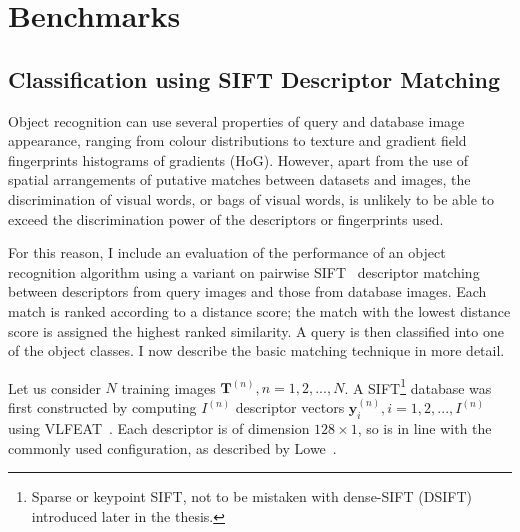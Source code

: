 \section{Benchmarks} \label{sec:benchmarks}




\subsection{Classification using SIFT Descriptor Matching}

Object recognition can use several properties of query and database image appearance, ranging from colour distributions to texture and gradient field fingerprints \eg histograms of gradients (HoG). However, apart from the use of spatial arrangements of putative matches between datasets and images, the discrimination of visual words, or bags of visual words, is unlikely to be able to exceed the discrimination power of the descriptors or fingerprints used.

For this reason, I include an evaluation of the performance of an object recognition algorithm using a variant on pairwise SIFT~\cite{lowe2004distinctive} descriptor matching between descriptors from query images and those from database images. Each match is ranked according to a distance score; the match with the lowest distance score is assigned the highest ranked similarity. A query is then classified into one of the object classes. I now describe the basic matching technique in more detail.

Let us consider $N$ training images $\mathbf{T}^{(n)}, n = 1, 2, ..., N$. A SIFT\footnote{Sparse or keypoint SIFT, not to be mistaken with dense-SIFT (DSIFT) introduced later in the thesis.} database was first constructed by computing $I^{(n)}$ descriptor vectors $\mathbf{y}_i^{(n)}, i = 1, 2, ..., I^{(n)}$ using VLFEAT~\cite{Vedaldi2008}. Each descriptor is of dimension $128\times 1$, so is in line with the commonly used configuration, as described by Lowe~\cite{lowe2004distinctive}.


